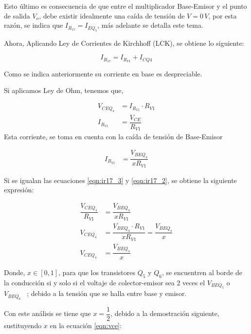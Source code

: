 \begin{enumerate}
        Esto último es consecuencia de que entre el multiplicador Base-Emisor y el punto de salida $V_o$, debe existir idealmente una caída de tensión de $V=0 \, V$, por esta razón, se indica que $I_{R_{17}}=I_{EQ_5}$, más adelante se detalla este tema.

        Ahora, Aplicando Ley de Corrientes de Kirchhoff (LCK), se obtiene lo siguiente:

        \begin{equation}
          I_{R_{17}}=I_{R_{V1}}+I_{CQ4}
          \label{eqn:ir17}
        \end{equation}

        Como se indica anteriormente su corriente en base es despreciable.

        Si aplicamos Ley de Ohm, tenemos que,


        \begin{align}
          {V_{CEQ_4}} & =I_{R_{V1}}\cdot R_{V1} \nonumber          \\[0.2cm]
          I_{R_{V1}}  & =\dfrac{V_{CE}}{R_{V1}} \label{eqn:ir17_3}
        \end{align}
        Esta corriente, se toma en cuenta con la caída de tensión de Base-Emisor

        \begin{align}
          I_{R_{V1}} & =\dfrac{V_{BEQ_4}}{xR_{V1}} \label{eqn:ir17_2}
        \end{align}

        Si se igualan las ecuaciones \ref{eqn:ir17_3} y \ref{eqn:ir17_2}, se obtiene la siguiente expresión:

        \begin{align}
          \dfrac{V_{CEQ_4}}{R_{V1}} & =\dfrac{V_{BEQ_4}}{xR_{V1}} \nonumber                                       \\[0.2cm]
          V_{CEQ_4}                 & = \dfrac{V_{BEQ_4}\cdot R_{V1} }{xR_{V1}} = \dfrac{V_{BEQ_4} }{x} \nonumber \\[0.2cm]
          V_{CEQ_4}                 & =\dfrac{V_{BEQ_4} }{x} \label{eqn:vce}
        \end{align}

        Donde, $x \in [0,1]$, para que los transistores $Q_5$ y $Q_6$, se encuentren al borde de la conducción si y solo si el voltaje de colector-emisor sea 2 veces el $V_{BEQ_5}$ o $V_{BEQ_6}$ \, ; debido a la tensión que se halla entre base y emisor.

        Con este análisis se tiene que $x=\dfrac{1}{2}$, debido a la demostración siguiente, sustituyendo $x$ en la ecuación \ref{eqn:vce}:


\end{enumerate}
